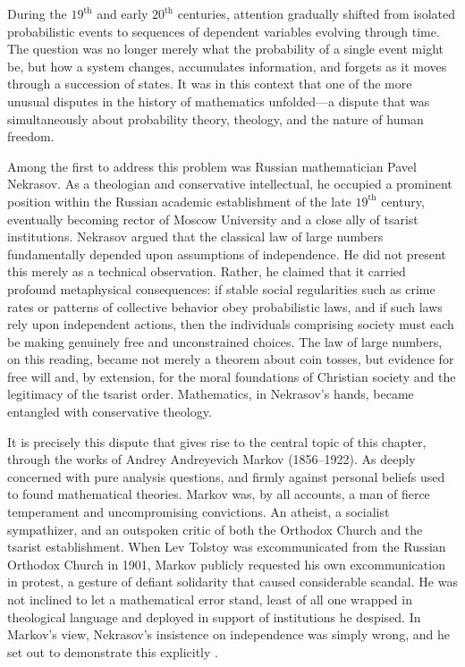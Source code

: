 \medskip

During the $19^{\text{th}}$ and early $20^{\text{th}}$ centuries, attention gradually shifted from isolated probabilistic events to sequences of dependent variables evolving through time. The question was no longer merely what the probability of a single event might be, but how a system changes, accumulates information, and forgets as it moves through a succession of states. It was in this context that one of the more unusual disputes in the history of mathematics unfolded---a dispute that was simultaneously about probability theory, theology, and the nature of human freedom.

\medskip

Among the first to address this problem was Russian mathematician Pavel Nekrasov. As a theologian and conservative intellectual, he occupied a prominent position within the Russian academic establishment of the late $19^{\text{th}}$ century, eventually becoming rector of Moscow University and a close ally of tsarist institutions. Nekrasov argued that the classical law of large numbers fundamentally depended upon assumptions of independence. He did not present this merely as a technical observation. Rather, he claimed that it carried profound metaphysical consequences: if stable social regularities such as crime rates or patterns of collective behavior obey probabilistic laws, and if such laws rely upon independent actions, then the individuals comprising society must each be making genuinely free and unconstrained choices. The law of large numbers, on this reading, became not merely a theorem about coin tosses, but evidence for free will and, by extension, for the moral foundations of Christian society and the legitimacy of the tsarist order. Mathematics, in Nekrasov's hands, became entangled with conservative theology.

\medskip

It is precisely this dispute that gives rise to the central topic of this chapter, through the works of Andrey Andreyevich Markov (1856--1922). As deeply concerned with pure analysis questions, and firmly against personal beliefs used to found mathematical theories. Markov was, by all accounts, a man of fierce temperament and uncompromising convictions. An atheist, a socialist sympathizer, and an outspoken critic of both the Orthodox Church and the tsarist establishment. When Lev Tolstoy was excommunicated from the Russian Orthodox Church in 1901, Markov publicly requested his own excommunication in protest, a gesture of defiant solidarity that caused considerable scandal. He was not inclined to let a mathematical error stand, least of all one wrapped in theological language and deployed in support of institutions he despised. In Markov's view, Nekrasov's insistence on independence was simply wrong, and he set out to demonstrate this explicitly \cite{markov_1906_extension}.

